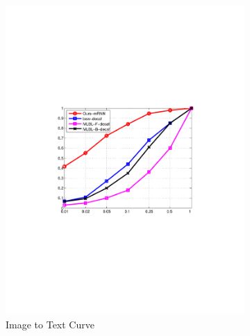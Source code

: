 \begin{figure}[htb]
        \centering
        \begin{subfigure}[b]{0.42\textwidth}
                \includegraphics[width=\textwidth]{PaperFigures/I2T_iaprtc.pdf}
                \caption{Image to Text Curve}
        \end{subfigure}%
        ~ %
        \begin{subfigure}[b]{0.42\textwidth}

\end{subfigure}
\end{figure}
